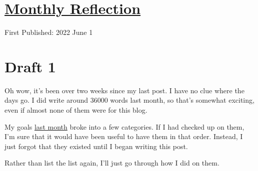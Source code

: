 \documentclass[12pt]{article}[titlepage]
\renewcommand{\,}{\textsuperscript{,}}
\begin{document}
\doublespacing
\section{\href{reflection-may-23.html}{Monthly Reflection}}
First Published: 2022 June 1

\section{Draft 1}
Oh wow, it's been over two weeks since my last post.
I have no clue where the days go.
I did write around 36000 words last month, so that's somewhat exciting, even if almost none of them were for this blog.

My goals \href{reflection-april-23.html}{last month} broke into a few categories.
If I had checked up on them, I'm sure that it would have been useful to have them in that order.
Instead, I just forgot that they existed until I began writing this post.

Rather than list the list again, I'll just go through how I did on them.
\end{document}
